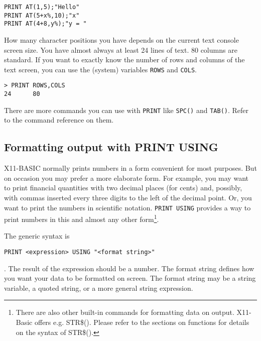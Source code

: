 \begin{mdframed}[hidealllines=true,backgroundcolor=blue!20]
\begin{verbatim}
PRINT AT(1,5);"Hello"
PRINT AT(5+x%,10);"x"
PRINT AT(4+8,y%);"y = "
\end{verbatim}
\end{mdframed}

How many character positions you have depends on the current text console screen
size. You have almost always at least 24 lines of text. 80 columns are standard.
If you want to exactly know the number of rows and columns of the text screen,
you can use the (system) variables \verb|ROWS| and \verb|COLS|.

\begin{mdframed}[hidealllines=true,backgroundcolor=black!20]
\begin{verbatim}
> PRINT ROWS,COLS
24      80
\end{verbatim}
\end{mdframed}

There are more commands you can use with \verb|PRINT| like \verb|SPC()| and
\verb|TAB()|. Refer to the command reference on them.

\subsection{Formatting output with PRINT USING}

X11-BASIC normally prints numbers in a form convenient for most purposes. But on
occasion you may prefer a more elaborate form. For example, you may want to
print financial quantities with two decimal places (for cents) and, possibly,
with commas inserted every three digits to the left of the decimal point. Or, 
you want to print the numbers in scientific notation. 
\verb|PRINT USING| provides a way to print numbers in this and almost any other
form\footnote{There are also other built-in commands for formatting data on
output. X11-Basic offers e.g. STR\$(). Please refer to the sections on
functions for details on the syntax of STR\$().}.

The generic syntax is 
\begin{verbatim}
PRINT <expression> USING "<format string>"
\end{verbatim}. The
result of the expression should be a number. The format string defines how you
want your data to be formatted on screen. The format string may be a string
variable, a quoted string, or a more general string expression.

